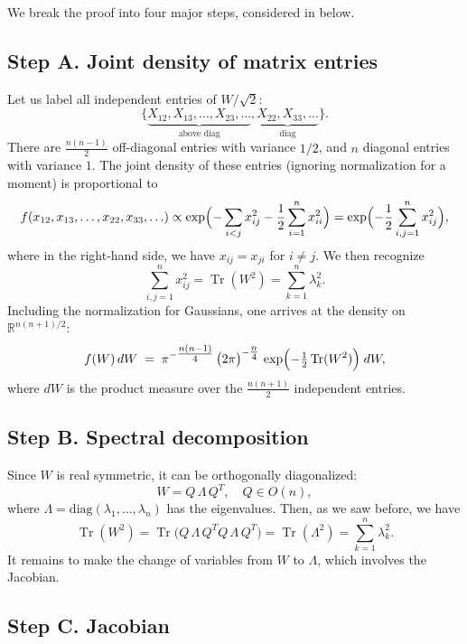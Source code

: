 \documentclass[letterpaper,11pt,oneside,reqno]{article}
\numberwithin{equation}{section}
\theoremstyle{definition}
\begin{document}
We break the proof into four major steps,
considered in
below.

\subsection{Step A. Joint density of matrix entries}
\label{subsec:density-entries}

Let us label all independent entries of \(W/\sqrt 2\):
\[
	\{\underbrace{X_{12}, X_{13},\dots, X_{23},\ldots }_{\text{above diag}},
	\underbrace{X_{22}, X_{33},\dots}_{\text{diag}}\}.
\]
There are \(\frac{n(n-1)}{2}\) off-diagonal entries
with variance $1/2$,
and \(n\) diagonal entries with variance $1$.
The joint density of these entries (ignoring normalization for a moment) is
proportional to
\begin{equation}
	\label{eq:GOE-density-entries-first}
	f(x_{12},x_{13},\ldots,x_{22},x_{33},\ldots )
  \propto\exp\Bigl(
    - \sum_{i<j} x_{ij}^2
    -\frac{1}{2} \sum_{i=1}^n x_{ii}^2
  \Bigr)=
	\exp
	\Bigl( -\frac{1}{2}\sum_{i,j=1}^n x_{ij}^2 \Bigr),
\end{equation}
where in the right-hand side, we have
$x_{ij}=x_{ji}$ for $i\ne j$.
We then recognize
\[
	\sum_{i,j=1}^n x_{ij}^2=\operatorname{Tr}(W^2)=\sum_{k=1}^n \lambda_k^2.
\]
Including the normalization for Gaussians, one arrives at
the density on $\mathbb{R}^{n(n+1)/2}$:
\[
  f(W)\,dW
  \;=\;
  \pi^{-\tfrac{n(n-1)}{4}}
  \,\bigl(2\pi\bigr)^{-\tfrac{n}{4}}
  \,\exp\Bigl(-\tfrac{1}{2}\operatorname{Tr}(W^2)\Bigr)\; dW,
\]
where \(dW\) is the product measure over the \(\tfrac{n(n+1)}{2}\) independent entries.

\subsection{Step B. Spectral decomposition}
\label{subsec:spectral}

Since \(W\) is real symmetric, it can be orthogonally diagonalized:
\[
  W = Q\,\Lambda\,Q^T,\quad
  Q \in O(n),
\]
where \(\Lambda = \mathrm{diag}(\lambda_1,\ldots,\lambda_n)\) has the eigenvalues.  Then, as we saw before, we have
\[
  \operatorname{Tr}(W^2)
  = \operatorname{Tr}\bigl(Q\,\Lambda\,Q^T Q\,\Lambda\,Q^T\bigr)
  = \operatorname{Tr}(\Lambda^2)
  = \sum_{k=1}^n \lambda_k^2.
\]
It remains to make the change of variables from \(W\) to \(\Lambda\), which involves the Jacobian.

\subsection{Step C. Jacobian}
\label{subsec:jacobian}
\end{document}
